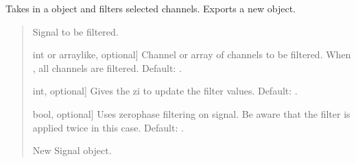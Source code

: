 \documentclass[letterpaper,10pt,english]{sphinxmanual}
\begin{document}
\begin{fulllineitems}
\begin{fulllineitems}
\label{\detokenize{classes:dsptoolbox.classes.filter_class.Filter.filter_signal}}
\pysigstartsignatures
{}
\pysigstopsignatures
\sphinxAtStartPar
Takes in a  object and filters selected channels. Exports a
new  object.
\begin{quote}\begin{description}
\begin{description}
\sphinxlineitem{\sphinxstylestrong{signal}}{[}\sphinxtitleref{Signal}{]}
\sphinxAtStartPar
Signal to be filtered.

\sphinxlineitem{\sphinxstylestrong{channel}}{[}int or array\sphinxhyphen{}like, optional{]}
\sphinxAtStartPar
Channel or array of channels to be filtered. When , all
channels are filtered. Default: .

\sphinxlineitem{\sphinxstylestrong{activate\_zi}}{[}int, optional{]}
\sphinxAtStartPar
Gives the zi to update the filter values. Default: .

\sphinxlineitem{\sphinxstylestrong{zero\_phase}}{[}bool, optional{]}
\sphinxAtStartPar
Uses zero\sphinxhyphen{}phase filtering on signal. Be aware that the filter
is applied twice in this case. Default: .

\end{description}

\begin{description}
\sphinxlineitem{\sphinxstylestrong{new\_signal}}{[}\sphinxtitleref{Signal}{]}
\sphinxAtStartPar
New Signal object.

\end{description}


\end{description}
\end{quote}
\end{fulllineitems}
\end{fulllineitems}
\end{document}
